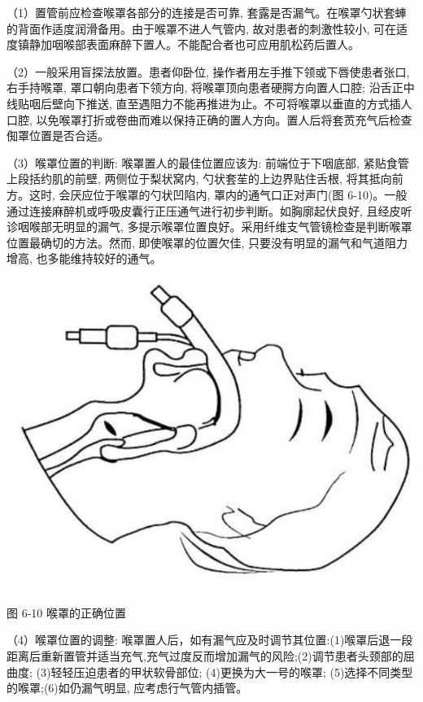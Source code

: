 \documentclass[10pt]{article}
\begin{document}
（1）置管前应检查喉罩各部分的连接是否可靠, 套露是否漏气。在喉罩勺状套蛼的背面作适度润滑备用。由于喉罩不进人气管内, 故对患者的刺激性较小, 可在适度镇静加咽喉部表面麻醉下置人。不能配合者也可应用肌松药后置人。

（2）一般采用盲探法放置。患者仰卧位, 操作者用左手推下领或下唇使患者张口, 右手持喉罩, 罩口朝向患者下领方向, 将喉罩顶向患者硬腭方向置人口腔; 沿舌正中线贴咽后壁向下推送, 直至遇阻力不能再推进为止。不可将喉罩以垂直的方式插人口腔, 以免喉罩打折或卷曲而难以保持正确的置人方向。置人后将套鿒充气后检查倁罩位置是否合适。

（3）喉罩位置的判断: 喉罩置人的最佳位置应该为: 前端位于下咽底部, 紧贴食管上段括约肌的前壁, 两侧位于梨状窝内, 勺状套苼的上边界贴住舌根, 将其抵向前方。这时, 会厌应位于喉罩的勺状凹陷内, 罩内的通气口正对声门(图 6-10)。一般通过连接麻醉机或呼吸皮囊行正压通气进行初步判断。如胸廓起伏良好, 且经皮听诊咽喉部无明显的漏气, 多提示喉罩位置良好。采用纤维支气管镜检查是判断喉罩位置最确切的方法。然而, 即使喉罩的位置欠佳, 只要没有明显的漏气和气道阻力增高, 也多能维持较好的通气。

\begin{center}
\includegraphics[max width=\textwidth]{2024_07_09_002a177993bd97d1d6d7g-094}
\end{center}

图 6-10 喉罩的正确位置

（4）喉罩位置的调整: 喉罩置人后，如有漏气应及时调节其位置:(1)喉罩后退一段距离后重新置管并适当充气,充气过度反而增加漏气的风险;(2)调节患者头颈部的屈曲度; (3)轻轻压迫患者的甲状软骨部位; (4)更换为大一号的喉罩; (5)选择不同类型的喉罩;(6)如仍漏气明显, 应考虑行气管内插管。
\end{document}
